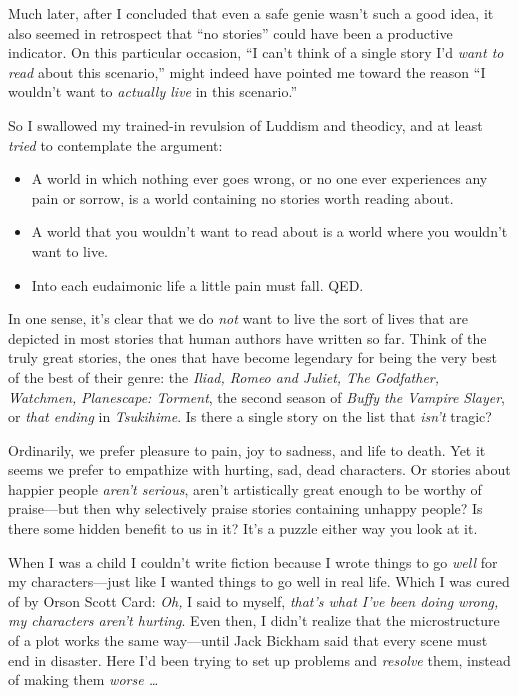 {
 Much later, after I concluded that even a safe genie
wasn't such a good idea, it also seemed in retrospect
that ``no stories'' could have been
a productive indicator. On this particular occasion,
``I can't think of a single story
I'd \textit{want to read} about this
scenario,'' might indeed have pointed me toward the
reason ``I wouldn't want to
\textit{actually live} in this scenario.''}

{
 So I swallowed my trained-in revulsion of Luddism and theodicy,
and at least \textit{tried} to contemplate the argument:}

\begin{itemize}
\item {
 A world in which nothing ever goes wrong, or no one ever
experiences any pain or sorrow, is a world containing no stories worth
reading about.}

\item {
 A world that you wouldn't want to read about is a
world where you wouldn't want to live.}

\item {
  Into each eudaimonic life a little pain must fall. QED.}
\end{itemize}

{
 In one sense, it's clear that we do \textit{not}
want to live the sort of lives that are depicted in most stories that
human authors have written so far. Think of the truly great stories,
the ones that have become legendary for being the very best of the best
of their genre: the \textit{Iliad, Romeo and Juliet, The Godfather,
Watchmen,} \textit{Planescape: Torment}, the second season of
\textit{Buffy the Vampire Slayer}, or \textit{that ending} in
\textit{Tsukihime}. Is there a single story on the list that
\textit{isn't} tragic?}

{
 Ordinarily, we prefer pleasure to pain, joy to sadness, and life
to death. Yet it seems we prefer to empathize with hurting, sad, dead
characters. Or stories about happier people
\textit{aren't serious}, aren't
artistically great enough to be worthy of praise---but then why
selectively praise stories containing unhappy people? Is there some
hidden benefit to us in it? It's a puzzle either way
you look at it.}

{
 When I was a child I couldn't write fiction
because I wrote things to go \textit{well} for my characters---just
like I wanted things to go well in real life. Which I was cured of by
Orson Scott Card: \textit{Oh,} I said to myself,
\textit{that's what I've been doing
wrong, my characters aren't hurting}. Even then, I
didn't realize that the microstructure of a plot works
the same way---until Jack Bickham said that every scene must end in
disaster. Here I'd been trying to set up problems and
\textit{resolve} them, instead of making them \textit{worse \ldots}}

